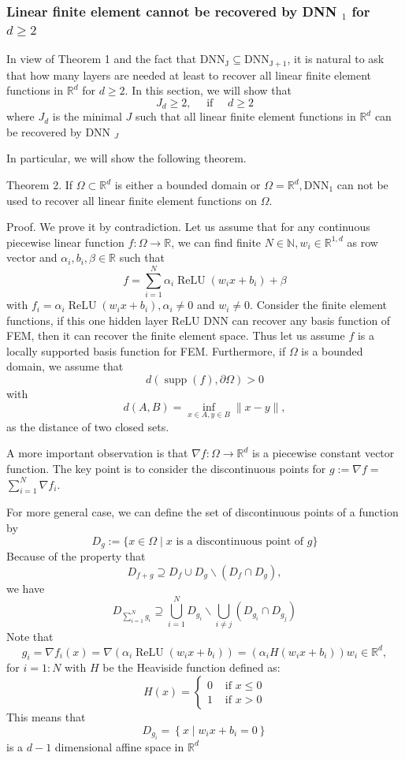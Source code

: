 \documentclass[10pt]{article}
\begin{document}
\subsubsection{Linear finite element cannot be recovered by DNN $_{1}$ for $d \geq 2$}
In view of Theorem 1 and the fact that $\mathrm{DNN}_{\mathrm{J}} \subseteq \mathrm{DNN}_{\mathrm{J}+1}$, it is natural to ask that how many layers are needed at least to recover all linear finite element functions in $\mathbb{R}^{d}$ for $d \geq 2$. In this section, we will show that
$$
J_{d} \geq 2, \quad \text { if } \quad d \geq 2
$$
where $J_{d}$ is the minimal $J$ such that all linear finite element functions in $\mathbb{R}^{d}$ can be recovered by DNN $_{J}$

In particular, we will show the following theorem.

Theorem 2. If $\Omega \subset \mathbb{R}^{d}$ is either a bounded domain or $\Omega=\mathbb{R}^{d}, \mathrm{DNN}_{1}$ can not be used to recover all linear finite element functions on $\Omega$.

Proof. We prove it by contradiction. Let us assume that for any continuous piecewise linear function $f: \Omega \rightarrow \mathbb{R}$, we can find finite $N \in \mathbb{N}, w_{i} \in \mathbb{R}^{1, d}$ as row vector and $\alpha_{i}, b_{i}, \beta \in \mathbb{R}$ such that
$$
f=\sum_{i=1}^{N} \alpha_{i} \operatorname{ReLU}\left(w_{i} x+b_{i}\right)+\beta
$$
with $f_{i}=\alpha_{i} \operatorname{ReLU}\left(w_{i} x+b_{i}\right), \alpha_{i} \neq 0$ and $w_{i} \neq 0 .$ Consider the finite element functions, if this one hidden layer ReLU DNN can recover any basis function of FEM, then it can recover the finite element space. Thus let us assume $f$ is a locally supported basis function for FEM. Furthermore, if $\Omega$ is a bounded domain, we assume that
$$
d(\operatorname{supp}(f), \partial \Omega)>0
$$
with
$$
d(A, B)=\inf _{x \in A, y \in B}\|x-y\|,
$$
as the distance of two closed sets.

A more important observation is that $\nabla f: \Omega \rightarrow \mathbb{R}^{d}$ is a piecewise constant vector function. The key point is to consider the discontinuous points for $g:=\nabla f=$ $\sum_{i=1}^{N} \nabla f_{i} .$

For more general case, we can define the set of discontinuous points of a function by
$$
D_{g}:=\{x \in \Omega \mid x \text { is a discontinuous point of } g\}
$$
Because of the property that
$$
D_{f+g} \supseteq D_{f} \cup D_{g} \backslash\left(D_{f} \cap D_{g}\right),
$$
we have
$$
D_{\sum_{i=1}^{N} g_{i}} \supseteq \bigcup_{i=1}^{N} D_{g_{i}} \backslash \bigcup_{i \neq j}\left(D_{g_{i}} \cap D_{g_{j}}\right)
$$
Note that
$$
g_{i}=\nabla f_{i}(x)=\nabla\left(\alpha_{i} \operatorname{ReLU}\left(w_{i} x+b_{i}\right)\right)=\left(\alpha_{i} H\left(w_{i} x+b_{i}\right)\right) w_{i} \in \mathbb{R}^{d},
$$
for $i=1: N$ with $H$ be the Heaviside function defined as:
$$
H(x)= \begin{cases}0 & \text { if } x \leq 0 \\ 1 & \text { if } x>0\end{cases}
$$
This means that
$$
D_{g_{i}}=\left\{x \mid w_{i} x+b_{i}=0\right\}
$$
is a $d-1$ dimensional affine space in $\mathbb{R}^{d}$
\end{document}
